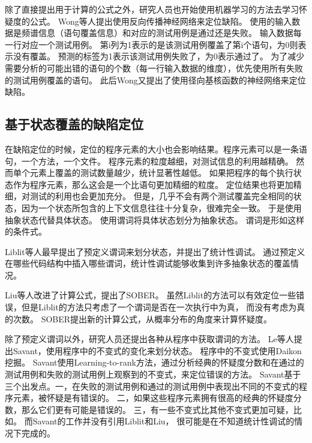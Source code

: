 除了直接提出用于计算的公式之外，研究人员也开始使用机器学习的方法去学习怀疑度的公式。
Wong等人提出使用反向传播神经网络来定位缺陷\parencite{W2009BP}。
使用的输入数据是频谱信息（语句覆盖信息）和对应的测试用例是通过还是失败。
输入数据每一行对应一个测试用例。
第i列为1表示的是该测试用例覆盖了第i个语句，为0则表示没有覆盖。
预测的标签为1表示该测试用例失败了，为0表示通过了。
为了减少需要分析的可能出错的语句的个数（每一行输入数据的维度），优先使用所有失败的测试用例覆盖的语句。
此后Wong又提出了使用径向基核函数的神经网络来定位缺陷\parencite{Wong2012Effective}。

\subsection{基于状态覆盖的缺陷定位}

在缺陷定位的时候，定位的程序元素的大小也会影响结果。程序元素可以是一条语句，一个方法，一个文件。
程序元素的粒度越细，对测试信息的利用越精确。
然而单个元素上覆盖的测试数量越少，统计显著性越低。
如果把程序的每个执行状态作为程序元素，那么这会是一个比语句更加精细的粒度。
定位结果也将更加精细，对测试的利用也会更加充分。
但是，几乎不会有两个测试覆盖完全相同的状态，因为一个状态所包含的上下文信息往往十分复杂，很难完全一致。
于是使用抽象状态代替具体状态。
使用谓词将具体状态划分为抽象状态。
谓词是形如这样的条件式。

Liblit等人最早提出了预定义谓词来划分状态\parencite{Liblit2005Scalable}，并提出了统计性调试。
通过预定义在哪些代码结构中插入哪些谓词，统计性调试能够收集到许多抽象状态的覆盖情况。

Liu等人改进了计算公式，提出了SOBER\parencite{Liu2006Statistical}。
虽然Liblit的方法可以有效定位一些错误，但是Liblit的方法只考虑了一个谓词是否在一次执行中为真，
而没有考虑为真的次数。
SOBER提出新的计算公式，从概率分布的角度来计算怀疑度。

除了预定义谓词以外，研究人员还提出各种从程序中获取谓词的方法。
Le等人提出Savant\parencite{Le2016A}，使用程序中的不变式的变化来划分状态。
程序中的不变式使用Daikon\parencite{Ernst2007The}挖掘。
Savant使用Learning-to-rank方法，通过分析经典的怀疑度分数和在通过的测试用例和失败的测试用例上观察到的不变式，来定位错误的方法。
Savant基于三个出发点。一，在失败的测试用例和通过的测试用例中表现出不同的不变式的程序元素，被怀疑是有错误的。
二，如果这些程序元素拥有很高的经典的怀疑度分数，那么它们更有可能是错误的。
三，有一些不变式比其他不变式更加可疑，比如。
而Savant的工作并没有引用Liblit\parencite{Liblit2005Scalable}和Liu\parencite{Liu2006Statistical}，
很可能是在不知道统计性调试的情况下完成的。

